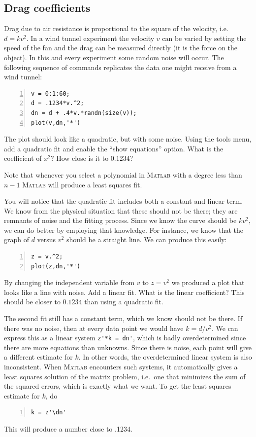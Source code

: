 
\subsection*{Drag coefficients}

Drag due to air resistance is proportional to the square of the
velocity, i.e.~$d= kv^2$.  In a wind tunnel experiment the velocity
$v$ can be varied by setting the speed of the fan and the drag can be
measured directly (it is the force on the object).  In this and every
experiment some random noise will occur. The following sequence of
commands replicates the data one might receive from a wind tunnel:
\begin{lstlisting}[frame=none,numbers=left]
v = 0:1:60;
d = .1234*v.^2;
dn = d + .4*v.*randn(size(v));
plot(v,dn,'*')
\end{lstlisting}
The plot should look like a quadratic, but with some noise.  Using the
tools menu, add a quadratic fit and enable the ``show equations''
option.  What is the coefficient of $x^2$? How close is it to 
$0.1234$?

Note that whenever you select a polynomial in \textsc{Matlab}
with a degree less than $n-1$ \textsc{Matlab} will produce a least squares
fit.

You will notice that the quadratic fit includes both a constant and
linear term.  We know from the physical situation that these should
not be there; they are remnants of noise and the fitting
process. Since we know the curve should be $k v^2$, we can do better
by employing that knowledge. For instance, we know that the graph of
$d$ versus $v^2$ should be a straight line. We can produce this easily:
\begin{lstlisting}[frame=none,numbers=left]
z = v.^2;
plot(z,dn,'*')
\end{lstlisting}
By changing the independent variable from $v$ to $z=v^2$ we produced a
plot that looks like a line with noise. Add a linear fit. What is the
linear coefficient? This should be closer to $0.1234$ than using a
quadratic fit.

The second fit still has a constant term, which we know should not be
there.  If there was no noise, then at every data point we would have
$k = d/v^2$. We can express this as a linear system \verb&z'*k = dn'&,
which is badly overdetermined since there are more equations than
unknowns. Since there is noise, each point will give a different
estimate for $k$. In other words, the overdetermined linear system is
also inconsistent. When \textsc{Matlab} encounters such systems, it
automatically gives a least squares solution of the matrix problem,
i.e.~one that minimizes the sum of the squared errors, which is
exactly what we want. To get the least squares estimate for $k$, do
\begin{lstlisting}[frame=none,numbers=left]
k = z'\dn'
\end{lstlisting}
This will produce a number close to .1234.

